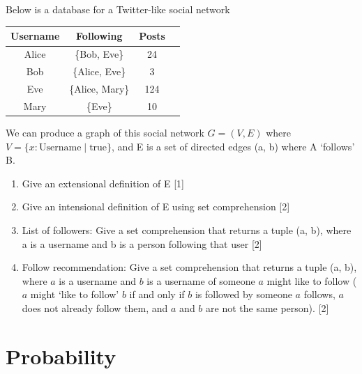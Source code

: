 \documentclass[twocolumn]{article}
\newcounter{pmarks}
\newcounter{marks}
\newcommand\mrk[1]{{\hfill\color{blue}\small[{#1}]}\addtocounter{pmarks}{#1}\addtocounter{marks}{#1}}
\begin{document}
\subsection{}

    Below is a database for a Twitter-like social network

    \begin{table}[h!]
        \centering
        \begin{tabular}{c | c | c | c }
            \toprule
            Username & Following & Posts \\
            \midrule
            Alice & \{Bob, Eve\} & 24 \\
            Bob & \{Alice, Eve\} & 3  \\
            Eve & \{Alice, Mary\} & 124 \\
            Mary & \{Eve\} & 10 \\
            \bottomrule
        \end{tabular}
    \end{table}

    We can produce a graph of this social network $ G = ( V, E)$ where $ V = \{ x : \text{Username} \mid \text{true} \}$, and E is a set of directed edges (a, b) where A `follows' B.

    \begin{enumerate}
        \item Give an extensional definition of E \mrk{1}
        \item Give an intensional definition of E using set comprehension \mrk{2}
        \item List of followers: Give a set comprehension that returns a tuple (a, b), where a is a username and b is a person following that user \mrk{2}
        \item Follow recommendation: Give a set comprehension that returns a tuple (a, b), where $a$ is a username and $b$ is a username of someone $a$ might like to follow ($a$ might `like to follow' $b$ if and only if $b$ is followed by someone $a$ follows, $a$ does not already follow them, and $a$ and $b$ are not the same person). \mrk{2}
    \end{enumerate}


\clearpage
\section{Probability}

\subsection{}
\end{document}
